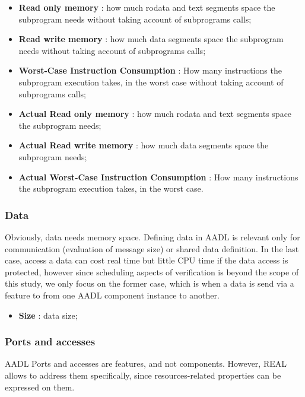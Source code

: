 \begin{itemize}
\item \textbf {Read only memory} : how much rodata and text segments 
space the subprogram needs without taking account of subprograms calls;
\item \textbf {Read write memory} : how much data segments space the 
subprogram needs without taking account of subprograms calls;
\item \textbf {Worst-Case Instruction Consumption} : How many 
instructions the subprogram execution takes, in the worst case without 
taking account of subprograms calls;
\item \textbf {Actual Read only memory} : how much rodata and text segments 
space the subprogram needs;
\item \textbf {Actual Read write memory} : how much data segments space the 
subprogram needs;
\item \textbf {Actual Worst-Case Instruction Consumption} : How many 
instructions the subprogram execution takes, in the worst case.
\end{itemize}

\subsubsection {Data}
\label {data_connection}

Obviously, data needs memory space. Defining data in AADL is relevant 
only for communication (evaluation of message size) or shared data 
definition. In the last case, access a data can cost real time but 
little CPU time if the data access is protected, however since 
scheduling aspects of verification is beyond the scope of this study, 
we only focus on the former case, which is when a data is send via a 
feature to from one AADL component instance to another.

\begin{itemize}
\item \textbf{Size} : data size;
\end{itemize}

\subsubsection {Ports and accesses}

AADL Ports and accesses are features, and not components. However, 
REAL allows to address them specifically, since resources-related 
properties can be expressed on them. 


